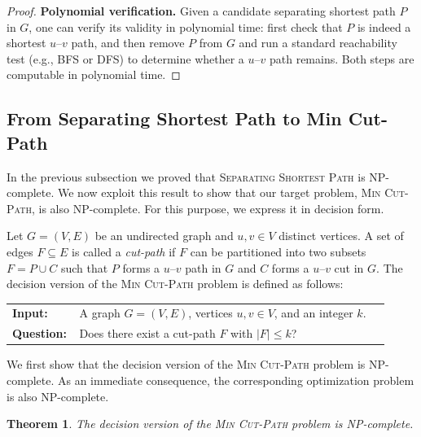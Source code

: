\documentclass[journal ]{new-aiaa}
\numberwithin{equation}{section}
\theoremstyle{definition}
\theoremstyle{plain}
\newtheorem{theorem}[definition]{Theorem}
\theoremstyle{remark}
\begin{document}
\begin{proof}
\smallskip
\noindent
\textbf{Polynomial verification.}  
Given a candidate separating shortest path $P$ in $G$, one can verify its validity in polynomial time:  
first check that $P$ is indeed a shortest $u$--$v$ path, and then remove $P$ from $G$ and run a standard reachability test (e.g., BFS or DFS) to determine whether a $u$--$v$ path remains.  
Both steps are computable in polynomial time.
   
\end{proof}

\subsection{From Separating Shortest Path to Min Cut-Path}\label{SSP_to_MCP}
In the previous subsection we proved that \textsc{Separating Shortest Path} is NP-complete.  
We now exploit this result to show that our target problem, \textsc{Min Cut-Path}, is also NP-complete.  
For this purpose, we express it in decision form.

\begin{problem}
Let $G=(V,E)$ be an undirected graph and $u,v \in V$ distinct vertices.  
A set of edges $F \subseteq E$ is called a \emph{cut-path} if $F$ can be partitioned into two subsets $F = P \cup C$ such that $P$ forms a $u$--$v$ path in $G$ and $C$ forms a $u$--$v$ cut in $G$.  
The decision version of the \textsc{Min Cut-Path} problem is defined as follows:

\begin{center}
\begin{tabular}{p{0.12\linewidth}p{0.8\linewidth}}
\textbf{Input:} & A graph $G=(V,E)$, vertices $u,v \in V$, and an integer $k$. \\
\textbf{Question:} & Does there exist a cut-path $F$ with $|F|\leq k$?
\end{tabular}
\end{center}
\end{problem}

We first show that the decision version of the \textsc{Min Cut-Path} problem is NP-complete.  
As an immediate consequence, the corresponding optimization problem is also NP-complete.

\begin{theorem}
\label{theorem:min_cut_path_np_complete}
The decision version of the \textsc{Min Cut-Path} problem is NP-complete. 
\end{theorem}
\end{document}
